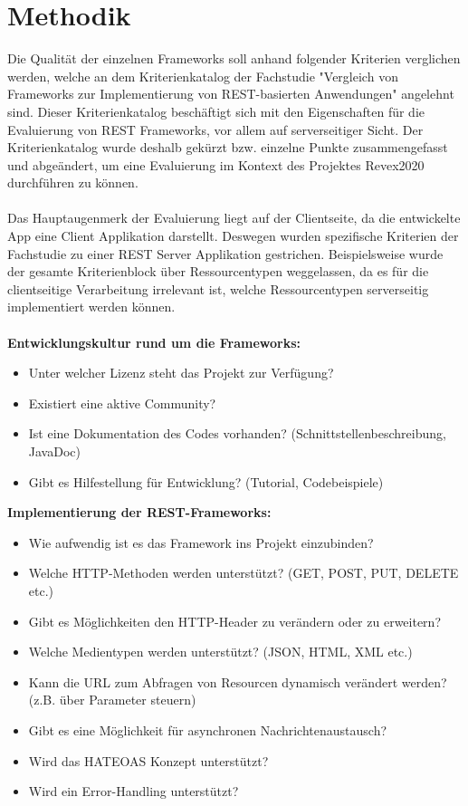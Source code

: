 \section{Methodik}
\label{sec:methodik}
Die Qualität der einzelnen Frameworks soll anhand folgender Kriterien verglichen werden, welche an dem Kriterienkatalog der Fachstudie "Vergleich von Frameworks zur Implementierung von REST-basierten Anwendungen" \cite{vergleich13} angelehnt sind. Dieser Kriterienkatalog beschäftigt sich mit den Eigenschaften für die Evaluierung von REST Frameworks, vor allem auf serverseitiger Sicht. Der Kriterienkatalog wurde deshalb gekürzt bzw. einzelne Punkte zusammengefasst und abgeändert, um eine Evaluierung im Kontext des Projektes Revex2020 durchführen zu können. 
\\\\
Das Hauptaugenmerk der Evaluierung liegt auf der Clientseite, da die entwickelte App eine Client Applikation darstellt. Deswegen wurden spezifische Kriterien der Fachstudie zu einer REST Server Applikation gestrichen. Beispielsweise wurde der gesamte Kriterienblock über Ressourcentypen \cite{ressourcen:rest} weggelassen, da es für die clientseitige Verarbeitung irrelevant ist, welche Ressourcentypen serverseitig implementiert werden können. 
\\\\
\textbf{Entwicklungskultur rund um die Frameworks:}
\begin{itemize}
	\item Unter welcher Lizenz steht das Projekt zur Verfügung?
	\item Existiert eine aktive Community?
	\item Ist eine Dokumentation des Codes vorhanden? (Schnittstellenbeschreibung, JavaDoc)	
	\item Gibt es Hilfestellung für Entwicklung? (Tutorial, Codebeispiele)
\end{itemize}

\textbf{Implementierung der REST-Frameworks:}
\begin{itemize}
	\item Wie aufwendig ist es das Framework ins Projekt einzubinden? 
	\item Welche \acrfull{HTTP}-Methoden werden unterstützt? (GET, POST, PUT, DELETE etc.)
	\item Gibt es Möglichkeiten den HTTP-Header zu verändern oder zu erweitern?
	\item Welche Medientypen werden unterstützt? (JSON, HTML, XML etc.)
	\item Kann die URL zum Abfragen von Resourcen dynamisch verändert werden? (z.B. über Parameter steuern)
	\item Gibt es eine Möglichkeit für asynchronen Nachrichtenaustausch?
	\item Wird das HATEOAS Konzept unterstützt?
	\item Wird ein Error-Handling unterstützt?	
\end{itemize}

